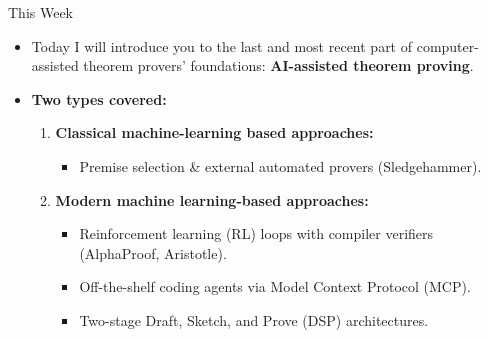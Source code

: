 \documentclass[compress,10pt,xcolor=dvipsnames]{beamer}
\begin{document}
\begin{frame}{This Week}

\begin{itemize}
  \item<1-> Today I will introduce you to the last and most recent part of computer-assisted theorem provers' foundations: \textbf{AI-assisted theorem proving}.
  \vspace{0.8em}
  \item<2-> \textbf{Two types covered:}
    \begin{enumerate}
      \item \textbf{Classical machine-learning based approaches:}
        \begin{itemize}
          \item Premise selection \& external automated provers (Sledgehammer).
        \end{itemize}
      \vspace{0.4em}
      \item \textbf{Modern machine learning-based approaches:}
        \begin{itemize}
          \item Reinforcement learning (RL) loops with compiler verifiers (AlphaProof, Aristotle).
          \item Off-the-shelf coding agents via Model Context Protocol (MCP).
          \item Two-stage Draft, Sketch, and Prove (DSP) architectures.
        \end{itemize}
    \end{enumerate}
\end{itemize}
\end{frame}
\end{document}
